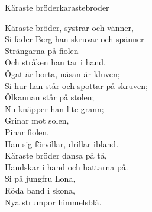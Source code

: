 \begin{song}{Käraste bröder}{karastebroder}
\begin{vers}
    Käraste bröder, systrar och vänner,\\
    Si fader Berg han skruvar och spänner\\
    Strängarna på fiolen\\
    Och stråken han tar i hand.\\
    Ögat är borta, näsan är kluven;\\
    Si hur han står och spottar på skruven;\\
    Ölkannan står på stolen;\\
    Nu knäpper han lite grann;\\
    Grinar mot solen,\\
    Pinar fiolen,\\
    Han sig förvillar, drillar ibland.\\
    Käraste bröder dansa på tå,\\
    Handskar i hand och hattarna på.\\
    Si på jungfru Lona,\\
    Röda band i skona,\\
    Nya strumpor himmelsblå.\\
\end{vers}
\end{song}